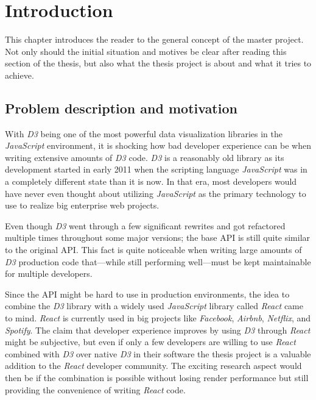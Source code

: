 \chapter{Introduction}
\label{cha:Introduction}

This chapter introduces the reader to the general concept of the master project. Not only should the initial situation and motives be clear after reading this section of the thesis, but also what the thesis project is about and what it tries to achieve.

\section{Problem description and motivation}

With \emph{D3} being one of the most powerful data visualization libraries in the \emph{JavaScript} environment, it is shocking how bad developer experience can be when writing extensive amounts of \emph{D3} code. \emph{D3} is a reasonably old library as its development started in early 2011 when the scripting language \emph{JavaScript} was in a completely different state than it is now. In that era, most developers would have never even thought about utilizing \emph{JavaScript} as the primary technology to use to realize big enterprise web projects. 

Even though \emph{D3} went through a few significant rewrites and got refactored multiple times throughout some major versions; the base API is still quite similar to the original API. This fact is quite noticeable when writing large amounts of \emph{D3} production code that---while still performing well---must be kept maintainable for multiple developers.

Since the API might be hard to use in production environments, the idea to combine the \emph{D3} library with a widely used \emph{JavaScript} library called \emph{React} came to mind. \emph{React} is currently used in big projects like \emph{Facebook}, \emph{Airbnb}, \emph{Netflix}, and \emph{Spotify}. The claim that developer experience improves by using \emph{D3} through \emph{React} might be subjective, but even if only a few developers are willing to use \emph{React} combined with \emph{D3} over native \emph{D3} in their software the thesis project is a valuable addition to the \emph{React} developer community. The exciting research aspect would then be if the combination is possible without losing render performance but still providing the convenience of writing \emph{React} code.

